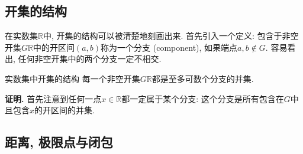 \subsection{开集的结构}
在实数集$\mathbb{R}$中, 开集的结构可以被清楚地刻画出来. 首先引入一个定义: 包含于非空开集$G\mathbb{R}$中的开区间$(a,b)$称为一个分支 (component), 如果端点$a,b\notin G$. 容易看出, 任何非空开集中的两个分支一定不相交.

\begin{theorem}{实数集中开集的结构}
每一个非空开集$G\mathbb{R}$都是至多可数个分支的并集. 
\end{theorem}
\textbf{证明.} 首先注意到任何一点$x\in\mathbb{R}$都一定属于某个分支: 这个分支是所有包含在$G$中且包含$x$的开区间的并集. 

\subsection{距离, 极限点与闭包}

